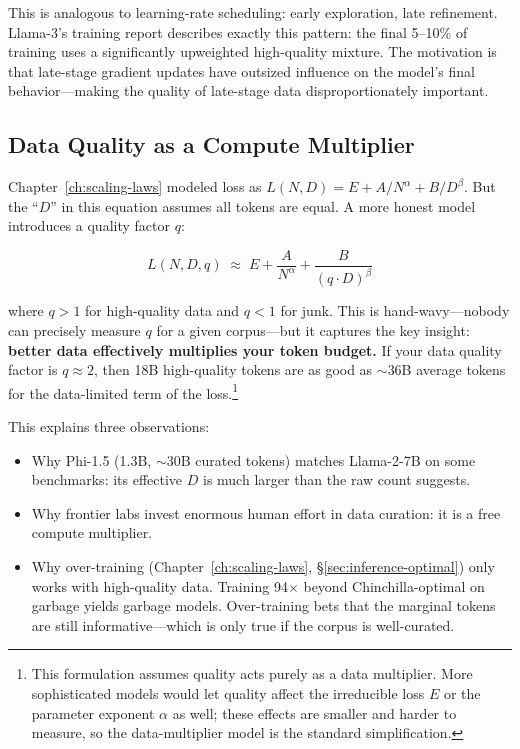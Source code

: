 This is analogous to learning-rate scheduling: early exploration, late refinement. Llama-3's training report describes exactly this pattern: the final 5--10\% of training uses a significantly upweighted high-quality mixture. The motivation is that late-stage gradient updates have outsized influence on the model's final behavior---making the quality of late-stage data disproportionately important.


\subsection{Data Quality as a Compute Multiplier}
\label{sec:quality-multiplier}

Chapter~\ref{ch:scaling-laws} modeled loss as $L(N, D) = E + A/N^\alpha + B/D^\beta$. But the ``$D$'' in this equation assumes all tokens are equal. A more honest model introduces a quality factor $q$:

\[ L(N, D, q) \;\approx\; E + \frac{A}{N^\alpha} + \frac{B}{(q \cdot D)^\beta} \]

where $q > 1$ for high-quality data and $q < 1$ for junk. This is hand-wavy---nobody can precisely measure $q$ for a given corpus---but it captures the key insight: \textbf{better data effectively multiplies your token budget.} If your data quality factor is $q \approx 2$, then 18B high-quality tokens are as good as $\sim$36B average tokens for the data-limited term of the loss.\footnote{This formulation assumes quality acts purely as a data multiplier. More sophisticated models would let quality affect the irreducible loss $E$ or the parameter exponent $\alpha$ as well; these effects are smaller and harder to measure, so the data-multiplier model is the standard simplification.}

This explains three observations:
\begin{itemize}[nosep]
  \item Why Phi-1.5 (1.3B, $\sim$30B curated tokens) matches Llama-2-7B on some benchmarks: its effective $D$ is much larger than the raw count suggests.
  \item Why frontier labs invest enormous human effort in data curation: it is a free compute multiplier.
  \item Why over-training (Chapter~\ref{ch:scaling-laws}, \S\ref{sec:inference-optimal}) only works with high-quality data. Training 94$\times$ beyond Chinchilla-optimal on garbage yields garbage models. Over-training bets that the marginal tokens are still informative---which is only true if the corpus is well-curated.
\end{itemize}

